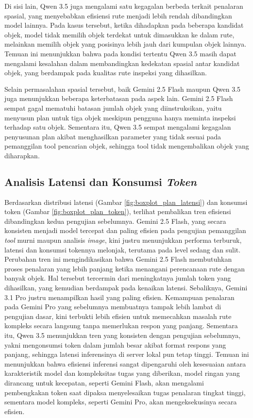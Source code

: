 Di sisi lain, Qwen 3.5 juga mengalami satu kegagalan berbeda terkait penalaran spasial, yang menyebabkan efisiensi rute menjadi lebih rendah dibandingkan model lainnya. Pada kasus tersebut, ketika dihadapkan pada beberapa kandidat objek, model tidak memilih objek terdekat untuk dimasukkan ke dalam rute, melainkan memilih objek yang posisinya lebih jauh dari kumpulan objek lainnya. Temuan ini menunjukkan bahwa pada kondisi tertentu Qwen 3.5 masih dapat mengalami kesalahan dalam membandingkan kedekatan spasial antar kandidat objek, yang berdampak pada kualitas rute inspeksi yang dihasilkan.

Selain permasalahan spasial tersebut, baik Gemini 2.5 Flash maupun Qwen 3.5 juga menunjukkan beberapa keterbatasan pada aspek lain. Gemini 2.5 Flash sempat gagal mematuhi batasan jumlah objek yang diinstruksikan, yaitu menyusun plan untuk tiga objek meskipun pengguna hanya meminta inspeksi terhadap satu objek. Sementara itu, Qwen 3.5 sempat mengalami kegagalan penyusunan plan akibat menghasilkan parameter yang tidak sesuai pada pemanggilan tool pencarian objek, sehingga tool tidak mengembalikan objek yang diharapkan.

\subsection{Analisis Latensi dan Konsumsi \textit{Token}}
Berdasarkan distribusi latensi (Gambar \ref{fig:boxplot_plan_latensi}) dan konsumsi token (Gambar \ref{fig:boxplot_plan_token}), terlihat pembalikan tren efisiensi dibandingkan kedua pengujian sebelumnya. Gemini 2.5 Flash, yang secara konsisten menjadi model tercepat dan paling efisien pada pengujian pemanggilan \textit{tool} murni maupun analisis \textit{image}, kini justru menunjukkan performa terburuk, latensi dan konsumsi tokennya melonjak, terutama pada level sedang dan sulit. Perubahan tren ini mengindikasikan bahwa Gemini 2.5 Flash membutuhkan proses penalaran yang lebih panjang ketika menangani perencanaan rute dengan banyak objek. Hal tersebut tercermin dari meningkatnya jumlah token yang dihasilkan, yang kemudian berdampak pada kenaikan latensi. Sebaliknya, Gemini 3.1 Pro justru menampilkan hasil yang paling efisien. Kemampuan penalaran pada Gemini Pro yang sebelumnya membuatnya tampak lebih lambat di pengujian dasar, kini terbukti lebih efisien untuk memecahkan masalah rute kompleks secara langsung tanpa memerlukan respon yang panjang. Sementara itu, Qwen 3.5 menunjukkan tren yang konsisten dengan pengujian sebelumnya, yakni mengonsumsi token dalam jumlah besar akibat format respons yang panjang, sehingga latensi inferensinya di server lokal pun tetap tinggi. Temuan ini menunjukkan bahwa efisiensi inferensi sangat dipengaruhi oleh kesesuaian antara karakteristik model dan kompleksitas tugas yang diberikan, model ringan yang dirancang untuk kecepatan, seperti Gemini Flash, akan mengalami pembengkakan token saat dipaksa menyelesaikan tugas penalaran tingkat tinggi, sementara model kompleks, seperti Gemini Pro, akan mengeksekusinya secara efisien.



